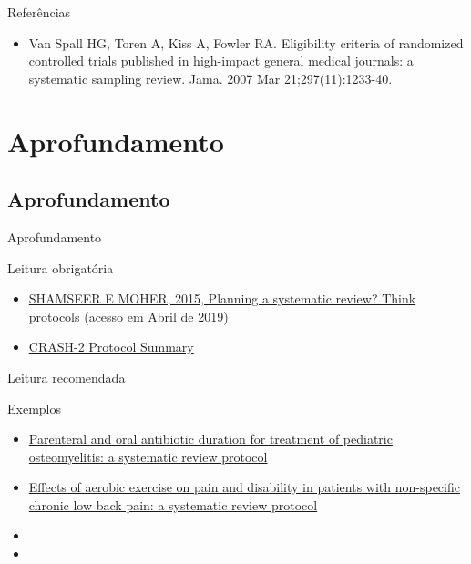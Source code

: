 \documentclass{beamer}
\begin{document}
\begin{frame}{Referências}
  \begin{itemize}
  \item Van Spall HG, Toren A, Kiss A, Fowler RA. Eligibility criteria of randomized controlled trials published in high-impact general medical journals: a systematic sampling review. Jama. 2007 Mar 21;297(11):1233-40.
  \end{itemize}
\end{frame}

\section{Aprofundamento}

\subsection{Aprofundamento}

\begin{frame}{Aprofundamento}
  \begin{block}{Leitura obrigatória}
    \scriptsize
    \begin{itemize}
    \item \href{http://blogs.biomedcentral.com/bmcblog/2015/01/05/planning-a-systematic-review-think-protocols/}
    {SHAMSEER E MOHER, 2015, Planning a systematic review? Think protocols (acesso em Abril de 2019)}
  \item \href{http://www.crash2.lshtm.ac.uk/SummaryEng.htm}{CRASH-2 Protocol Summary}
    \end{itemize}
  \end{block}
  \begin{block}{Leitura recomendada}
    \begin{exampleblock}{\tiny Exemplos}
      \begin{itemize}
        \tiny
      \item \href{https://doi.org/10.1186/2046-4053-2-92}
        {Parenteral and oral antibiotic duration for treatment of pediatric osteomyelitis: a systematic review protocol}
      \item \href{https://doi.org/10.1186/s13643-019-1019-3}
        {Effects of aerobic exercise on pain and disability in patients with non-specific chronic low back pain: a systematic review protocol}
      \end{itemize}
    \end{exampleblock}
    \begin{itemize}
      \tiny
    \item 
    \item 
  \end{itemize}

  \end{block}
\end{frame}
\end{document}
